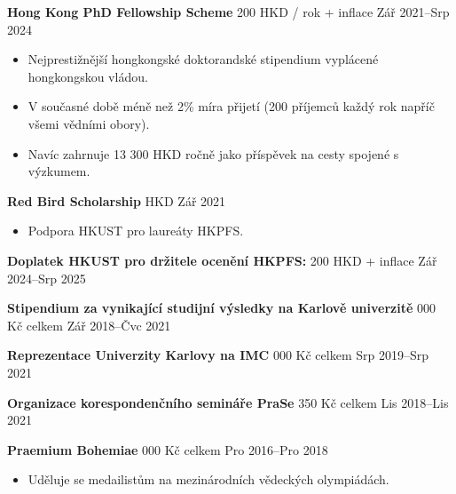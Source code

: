 \ifczech

\textbf{Hong Kong PhD Fellowship Scheme}  200 HKD / rok + inflace \hfill Zář 2021--Srp 2024
\begin{itemize}
    \item Nejprestižnější hongkongské doktorandské stipendium vyplácené hongkongskou vládou.
\item V současné době méně než 2\% míra přijetí (200 příjemců každý rok napříč všemi vědními obory).
    \item Navíc zahrnuje 13 300 HKD ročně jako příspěvek na cesty spojené s výzkumem.
\end{itemize} \par
\textbf{Red Bird Scholarship}  HKD \hfill Zář 2021
\begin{itemize}
    \item Podpora HKUST pro laureáty HKPFS.
\end{itemize} \par
\textbf{Doplatek HKUST pro držitele ocenění HKPFS:}  200 HKD + inflace \hfill Zář 2024--Srp 2025 \par
\textbf{Stipendium za vynikající studijní výsledky na Karlově univerzitě}  000 Kč celkem \hfill Zář 2018--Čvc 2021 \par
\textbf{Reprezentace Univerzity Karlovy na IMC}  000 Kč celkem \hfill Srp 2019--Srp 2021 \par
\textbf{Organizace korespondenčního semináře PraSe}  350 Kč celkem \hfill Lis 2018--Lis 2021 \par
\textbf{Praemium Bohemiae}  000 Kč celkem \hfill Pro 2016--Pro 2018
\begin{itemize}
    \item Uděluje se medailistům na mezinárodních vědeckých olympiádách.
\end{itemize}
\else

